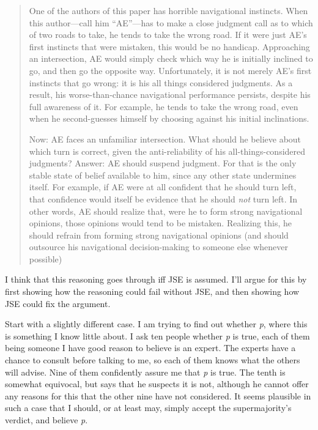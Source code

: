 \documentclass[
  11pt,
  letterpaper,
  DIV=11,
  numbers=noendperiod,
  twoside]{scrartcl}
\begin{document}
\begin{quote}
One of the authors of this paper has horrible navigational instincts.
When this author---call him ``AE''---has to make a close judgment call
as to which of two roads to take, he tends to take the wrong road. If it
were just AE's first instincts that were mistaken, this would be no
handicap. Approaching an intersection, AE would simply check which way
he is initially inclined to go, and then go the opposite way.
Unfortunately, it is not merely AE's first instincts that go wrong: it
is his all things considered judgments. As a result, his
worse-than-chance navigational performance persists, despite his full
awareness of it. For example, he tends to take the wrong road, even when
he second-guesses himself by choosing against his initial inclinations.

Now: AE faces an unfamiliar intersection. What should he believe about
which turn is correct, given the anti-reliability of his
all-things-considered judgments? Answer: AE should suspend judgment. For
that is the only stable state of belief available to him, since any
other state undermines itself. For example, if AE were at all confident
that he should turn left, that confidence would itself be evidence that
he should \emph{not} turn left. In other words, AE should realize that,
were he to form strong navigational opinions, those opinions would tend
to be mistaken. Realizing this, he should refrain from forming strong
navigational opinions (and should outsource his navigational
decision-making to someone else whenever possible)
\end{quote}

I think that this reasoning goes through iff JSE is assumed. I'll argue
for this by first showing how the reasoning could fail without JSE, and
then showing how JSE could fix the argument.

Start with a slightly different case. I am trying to find out whether
\emph{p}, where this is something I know little about. I ask ten people
whether \emph{p} is true, each of them being someone I have good reason
to believe is an expert. The experts have a chance to consult before
talking to me, so each of them knows what the others will advise. Nine
of them confidently assure me that \emph{p} is true. The tenth is
somewhat equivocal, but says that he suspects it is not, although he
cannot offer any reasons for this that the other nine have not
considered. It seems plausible in such a case that I should, or at least
may, simply accept the supermajority's verdict, and believe \emph{p}.
\end{document}
